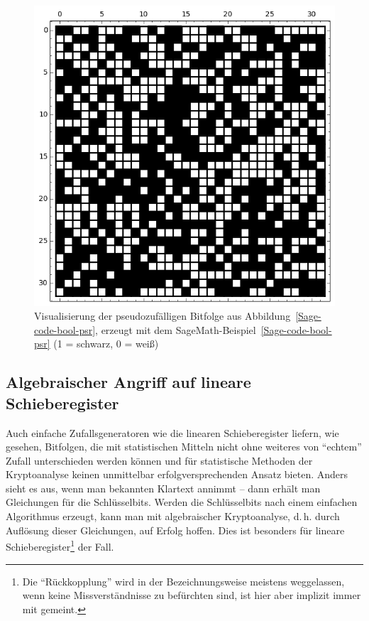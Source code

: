\begin{refsegment}
\begin{figure}[htbp]
\begin{center}
\includegraphics[scale=0.5]{figures/BC_lfsr_ex1.png}   %
\end{center}
\caption{Visualisierung der pseudozufälligen Bitfolge aus Abbildung~\ref{Sage-code-bool-psr},
   erzeugt mit dem SageMath-Beispiel~\ref{Sage-code-bool-psr}
   (1 = schwarz, 0 = weiß)}\label{fig-bool-lfsr2}
\end{figure}
\clearpage

\subsection{Algebraischer Angriff
            auf lineare Schieberegister}\label{ss-bool-alg2}

Auch einfache Zufallsgeneratoren wie die linearen
Schieberegister liefern,
wie gesehen, Bitfolgen, die mit statistischen Mitteln nicht ohne weiteres
von "`echtem"' Zufall unterschieden werden können und für statistische
Methoden der Kryptoanalyse keinen unmittelbar erfolgversprechenden
Ansatz bieten. Anders sieht es aus, wenn man
bekannten Klartext annimmt
-- dann erhält man Gleichungen für die Schlüsselbits. Werden die
Schlüsselbits nach einem einfachen Algorithmus erzeugt, kann man
mit algebraischer
Kryptoanalyse,
d.\,h. durch Auflösung dieser Gleichungen, auf Erfolg hoffen. Dies ist besonders
für lineare Schieberegister\footnote{%
  Die "`Rückkopplung"' wird in der Bezeichnungsweise meistens weggelassen,
  wenn keine Missverständnisse zu befürchten sind, ist hier aber implizit
  immer mit gemeint.
} der Fall.


\end{refsegment}

